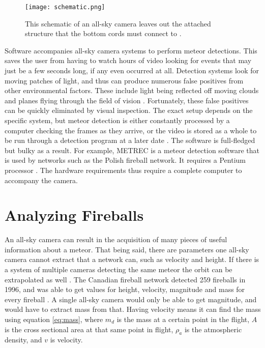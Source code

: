 \begin{figure}[ht!]
	\centering
	\texttt{[image: schematic.png]}
	\caption{This schematic of an all-sky camera leaves out the attached structure that the bottom cords must connect to \protect\cite{Bannister2012}.}
	\label{fig:schematic}
\end{figure}

Software accompanies all-sky camera systems to perform meteor detections. This saves the user from having to watch hours of video looking for events that may just be a few seconds long, if any even occurred at all. Detection systems look for moving patches of light, and thus can produce numerous false positives from other environmental factors. These include light being reflected off moving clouds and planes flying through the field of vision \cite{Harbaugh2008}. Fortunately, these false positives can be quickly eliminated by visual inspection. The exact setup depends on the specific system, but meteor detection is either constantly processed by a computer checking the frames as they arrive, or the video is stored as a whole to be run through a detection program at a later date \cite{Molau2005}. The software is full-fledged but bulky as a result. For example, METREC is a meteor detection software that is used by networks such as the Polish fireball network. It requires a Pentium processor \cite{Molau2005}. The hardware requirements thus require a complete computer to accompany the camera.  

\section{Analyzing Fireballs}

An all-sky camera can result in the acquisition of many pieces of useful information about a meteor. That being said, there are parameters one all-sky camera cannot extract that a network can, such as velocity and height. If there is a system of multiple cameras detecting the same meteor the orbit can be extrapolated as well \cite{Trigo-Rodriguez2009}. The Canadian fireball network detected 259 fireballs in 1996, and was able to get values for height, velocity, magnitude and mass for every fireball \cite{Halliday1996}. A single all-sky camera would only be able to get magnitude, and would have to extract mass from that. Having velocity means it can find the mass using equation \ref{eq:mass}, where $m_d$ is the mass at a certain point in the flight, $A$ is the cross sectional area at that same point in flight, $\rho_a$ is the atmospheric density, and $v$ is velocity.

